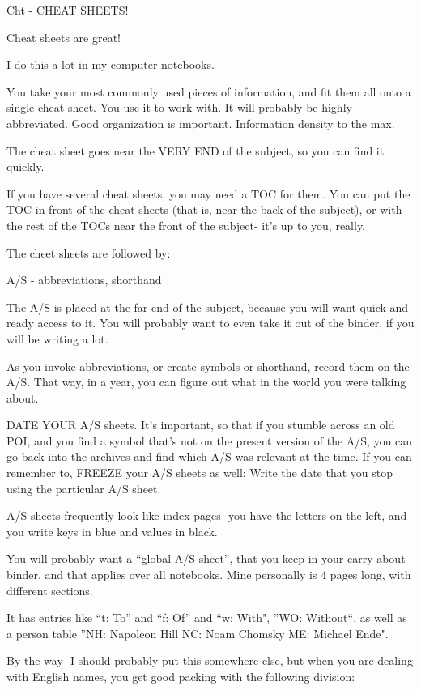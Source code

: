 \documentclass[oneside]{book}
\begin{document}
Cht - CHEAT SHEETS!

  Cheat sheets are great!

  I do this a lot in my computer notebooks.

  You take your most commonly used pieces of information, and fit them
all onto a single cheat sheet. You use it to work with. It will
probably be highly abbreviated. Good organization is
important. Information density to the max.

  The cheat sheet goes near the VERY END of the subject, so you can
find it quickly.

  If you have several cheat sheets, you may need a TOC for them. You
can put the TOC in front of the cheat sheets (that is, near the back
of the subject), or with the rest of the TOCs near the front of the
subject- it's up to you, really.

  The cheet sheets are followed by:


A/S     - abbreviations, shorthand

  The A/S is placed at the far end of the subject, because you will
want quick and ready access to it. You will probably want to even take
it out of the binder, if you will be writing a lot.

  As you invoke abbreviations, or create symbols or shorthand, record
them on the A/S. That way, in a year, you can figure out what in the
world you were talking about.

  DATE YOUR A/S sheets. It's important, so that if you stumble across
an old POI, and you find a symbol that's not on the present version of
the A/S, you can go back into the archives and find which A/S was
relevant at the time. If you can remember to, FREEZE your A/S sheets
as well: Write the date that you stop using the particular A/S sheet.

  A/S sheets frequently look like index pages- you have the letters on
the left, and you write keys in blue and values in black.

  You will probably want a ``global A/S sheet'', that you keep in your
carry-about binder, and that applies over all notebooks. Mine
personally is 4 pages long, with different sections.

  It has entries like ``t: To'' and ``f: Of'' and ``w: With", ''WO:
Without``, as well as a person table ''NH: Napoleon Hill NC: Noam
Chomsky ME: Michael Ende".

  By the way- I should probably put this somewhere else, but when you
are dealing with English names, you get good packing with the
following division:
\end{document}
